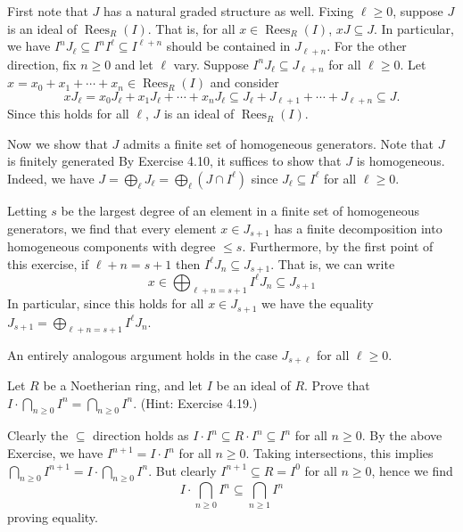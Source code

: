 \documentclass[../../master.tex]{subfiles}
\DeclareMathOperator{\Rees}{Rees}
\begin{document}
\begin{solution}
    First note that $J$ has a natural graded structure as well.
    Fixing $\ell \geq 0$, suppose $J$ is an ideal of $\Rees_R(I)$.
    That is, for all $x \in \Rees_R(I)$, $xJ \subseteq J$.
    In particular, we have $I^{n} J_\ell \subseteq I^{n} I^{\ell} \subseteq I^{\ell + n}$ should be contained in $J_{\ell + n}$.
    For the other direction, fix $n \geq 0$ and let $\ell$ vary.
    Suppose $I^{n} J_\ell \subseteq J_{\ell + n}$ for all $\ell \geq 0$.
    Let $x = x_0 + x_1 + \cdots + x_n \in \Rees_R(I)$ and consider
    \[
    xJ_\ell = x_0J_\ell + x_1J_\ell + \cdots + x_n J_\ell \subseteq J_\ell + J_{\ell + 1} + \cdots + J_{\ell + n} \subseteq J.
    \]
    Since this holds for all $\ell$, $J$ is an ideal of $\Rees_R(I)$.

    Now we show that $J$ admits a finite set of homogeneous generators.
    Note that $J$ is finitely generated By Exercise 4.10, it suffices to show that $J$ is homogeneous.
    Indeed, we have $J = \bigoplus_\ell J_\ell = \bigoplus_\ell (J \cap I^{\ell})$ since $J_\ell \subseteq I^{\ell}$ for all $\ell \geq 0$.

    Letting $s$ be the largest degree of an element in a finite set of homogeneous generators, we find that every element $x \in J_{s+1}$ has a finite decomposition into homogeneous components with degree $\leq s$.
    Furthermore, by the first point of this exercise, if $\ell + n = s+1$ then $I^{\ell} J_n \subseteq J_{s+1}$.
    That is, we can write 
    \[
    x \in \bigoplus_{\ell + n = s+1} I^{\ell} J_n \subseteq J_{s+1}
    \]
    In particular, since this holds for all $x \in J_{s+1}$ we have the equality $J_{s+1} = \bigoplus_{\ell + n = s+1} I^{\ell} J_n$.
    
    An entirely analogous argument holds in the case $J_{s+\ell}$ for all $\ell \geq 0$.
\end{solution}

\begin{problem}
    Let $R$ be a Noetherian ring, and let $I$ be an ideal of $R$.
    Prove that $I \cdot \bigcap_{n \geq 0} I^{n} = \bigcap_{n \geq 0} I^{n}$.
    (Hint: Exercise 4.19.)
\end{problem}

\begin{solution}
    Clearly the $\subseteq$ direction holds as $I \cdot I^{n} \subseteq R \cdot I^{n} \subseteq I^{n}$ for all $n \geq 0$.
    By the above Exercise, we have $I^{n+1} = I \cdot I^{n}$ for all $n \geq 0$.
    Taking intersections, this implies $\bigcap_{n \geq 0} I^{n+1} = I \cdot \bigcap_{n \geq 0} I^{n}$.
    But clearly $I^{n+1} \subseteq R = I^{0}$ for all $n \geq 0$, hence we find
    \[
    I \cdot \bigcap_{n \geq 0} I^{n} \subseteq \bigcap_{n \geq 1} I^{n}
    \]
    proving equality.
\end{solution}
\end{document}
